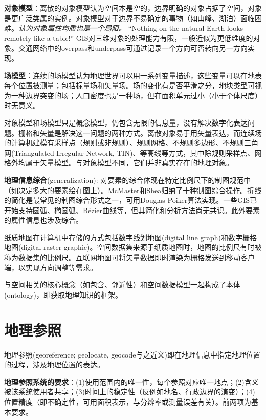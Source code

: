\par \textbf{对象模型}：离散的对象模型认为空间本是空的，边界明确的对象占据了空间，对象是更广泛类属的实例。对象模型对于边界不易确定的事物（如山峰、湖泊）面临困难。\emph{认为对象属性均质也是一个局限。} ``Nothing on the natural Earth looks remotely like a table!'' GIS对三维对象的处理能力有限，一般近似为更低维度的对象。交通网络中的overpass和underpass可通过记录一个方向可否转向另一方向实现。

\par \textbf{场模型}：连续的场模型认为地理世界可以用一系列变量描述，这些变量可以在地表每个位置被测量；包括标量场和矢量场。场的变化有是否平滑之分，地块类型可视为一种边界突变的场；人口密度也是一种场，但在面积单元过小（小于个体尺度）时无意义。

\par 对象模型和场模型只是概念模型，仍包含无限的信息量，没有解决数字化表达问题。栅格和矢量是解决这一问题的两种方式。离散对象易于用矢量表达，而连续场的计算机建模有采样点（规则或非规则）、规则网格、不规则多边形、不规则三角网(Triangulated Irregular Network, TIN)、等高线等方式，其中除规则采样点、网格外均属于矢量模型。与对象模型不同，它们并非真实存在的地理对象。

\par \textbf{地理信息综合}(generalization): 对要素的综合体现在特定比例尺下的制图规范中（如决定多大的要素绘在图上）。McMaster和Shea归纳了十种制图综合操作。折线的简化是最常见的制图综合形式之一，可用Douglas-Poiker算法实现。一些GIS已开始支持圆弧、椭圆弧、Bézier曲线等，但其简化和分析方法尚无共识。此外要素的属性信息也涉及综合。

\par 纸质地图在计算机中存储的方式包括数字线划地图(digital line graph)和数字栅格地图(digital raster graphic)。空间数据集来源于纸质地图时，地图的比例尺有时被称为数据集的比例尺。互联网地图可将矢量数据即时渲染为栅格发送到移动客户端，以实现方向调整等需求。

\par 与空间相关的核心概念（如包含、邻近性）和空间数据模型一起构成了本体(ontology)，即获取地理知识的框架。

\section{地理参照}

\par 地理参照(georeference; geolocate, geocode与之近义)即在地理信息中指定地理位置的过程，涉及地理位置的表达。

\par \textbf{地理参照系统的要求}：(1)使用范围内的唯一性，每个参照对应唯一地点；(2)含义被该系统使用者共享；(3)时间上的稳定性（反例如地名、行政边界的演变）；(4)位置精度（即不确定性，可用面积表示，与分辨率或测量误差有关）。前两项为基本要求。

